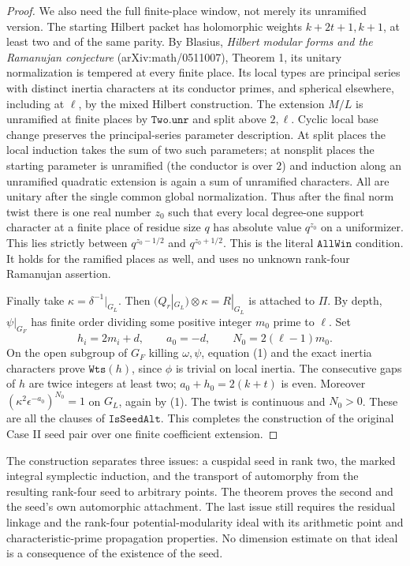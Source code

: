 \begin{proof}
We also need the full finite-place window, not merely its
unramified version. The starting Hilbert packet has holomorphic
weights \(k+2t+1,k+1\), at least two and of the same parity.
By Blasius, \emph{Hilbert modular forms and the Ramanujan
conjecture} (arXiv:math/0511007), Theorem 1, its unitary
normalization is tempered at every finite place.
Its local types are principal series with distinct inertia
characters at its conductor primes, and spherical elsewhere,
including at \(\ell\), by the mixed Hilbert construction.
The extension \(M/L\) is unramified at finite places by
\(\texttt{Two.unr}\) and split above \(2,\ell\).
Cyclic local base change preserves the principal-series
parameter description. At split places the local induction
takes the sum of two such parameters; at nonsplit places the
starting parameter is unramified (the conductor is over \(2\))
and induction along an unramified quadratic extension is again
a sum of unramified characters. All are unitary after the
single common global normalization. Thus after the final norm
twist there is one real number \(z_0\) such that every local
degree-one support character at a finite place of residue size
\(q\) has absolute value \(q^{z_0}\) on a uniformizer.
This lies strictly between \(q^{z_0-1/2}\) and
\(q^{z_0+1/2}\). This is the literal \(\texttt{AllWin}\)
condition. It holds for the ramified places as well, and uses
no unknown rank-four Ramanujan assertion.

Finally take \(\kappa=\delta^{-1}|_{G_L}\).
Then \((Q_r|_{G_L})\otimes\kappa=R|_{G_L}\) is attached
to \(\Pi\). By depth, \(\psi|_{G_F}\) has finite order dividing
some positive integer \(m_0\) prime to \(\ell\). Set
\[
 h_i=2m_i+d,\qquad a_0=-d,\qquad N_0=2(\ell-1)m_0 .
\]
On the open subgroup of \(G_F\) killing \(\omega,\psi\),
equation (1) and the exact inertia characters prove
\(\texttt{Wts}(h)\), since \(\phi\) is trivial on local inertia.
The consecutive gaps of \(h\) are twice integers at least two;
\(a_0+h_0=2(k+t)\) is even. Moreover
\((\kappa^2\epsilon^{-a_0})^{N_0}=1\) on \(G_L\),
again by (1). The twist is continuous and \(N_0>0\).
These are all the clauses of \(\texttt{IsSeedAlt}\).
This completes the construction of the original Case II
seed pair over one finite coefficient extension.
\end{proof}

The construction separates three issues: a cuspidal seed in rank
two, the marked integral symplectic induction, and the transport
of automorphy from the resulting rank-four seed to arbitrary
points. The theorem proves the second and the seed's own
automorphic attachment. The last issue still requires the
residual linkage and the rank-four potential-modularity ideal
with its arithmetic point and characteristic-prime propagation
properties. No dimension estimate on that ideal is a consequence
of the existence of the seed.
